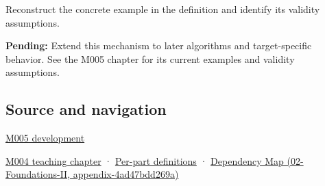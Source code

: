 Reconstruct the concrete example in the definition and identify its validity assumptions.

\textbf{Pending:} Extend this mechanism to later algorithms and target-specific behavior. See the M005 chapter for its current examples and validity assumptions.

\subsection{Source and navigation}\label{source-and-navigation}

\href{Continuous\%20Notes/Computing\%20Foundations\%20-\%20From\%20Bits\%20to\%20C++\%20and\%20Systems\%20APIs\#When\%20arithmetic\%20meets\%20uncertainty}{M005 development}

\href{Continuous\%20Notes/Computing\%20Foundations\%20-\%20From\%20Bits\%20to\%20C++\%20and\%20Systems\%20APIs\#A\%20stretching\%20ruler\%20for\%20real-valued\%20quantities}{M004 teaching chapter} · \hyperref[appendix-fd090d982a15]{Per-part definitions} · \href{}{Dependency Map (02-Foundations-II, appendix-4ad47bdd269a)}

